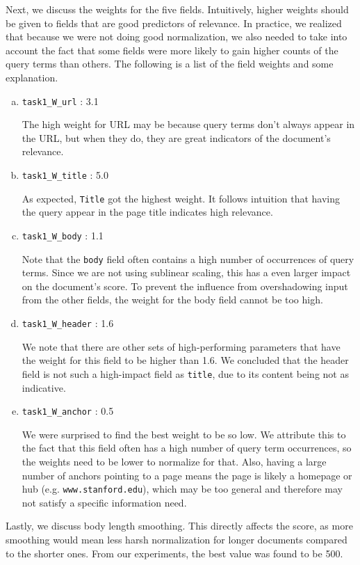 \documentclass[10pt,twocolumn]{article}
\begin{document}
Next, we discuss the weights for the five fields. Intuitively, higher weights should be given to fields that are good predictors of relevance. In practice, we realized that because we were not doing good normalization, we also needed to take into account the fact that some fields were more likely to gain higher counts of the query terms than others. The following is a list of the field weights and some explanation.
\begin{enumerate}[(a)]
\item \texttt{task1\_W\_url} : 3.1

The high weight for URL may be because query terms don't always appear in the URL, but when they do, they are great indicators of the document's relevance.
\item \texttt{task1\_W\_title} : 5.0

As expected, \texttt{Title} got the highest weight. It follows intuition that having the query appear in the page title indicates high relevance. 
\item \texttt{task1\_W\_body} : 1.1

Note that the \texttt{body} field often contains a high number of occurrences of query terms. Since we are not using sublinear scaling, this has a even larger impact on the document's score. To prevent the influence from overshadowing input from the other fields, the weight for the body field cannot be too high.
\item \texttt{task1\_W\_header} : 1.6

We note that there are other sets of high-performing parameters that have the weight for this field to be higher than 1.6. We concluded that the header field is not such a high-impact field as \texttt{title}, due to its content being not as indicative.
\item \texttt{task1\_W\_anchor} : 0.5

We were surprised to find the best weight to be so low. We attribute this to the fact that this field often has a high number of query term occurrences, so the weights need to be lower to normalize for that. Also, having a large number of anchors pointing to a page means the page is likely a homepage or hub (e.g. \texttt{www.stanford.edu}), which may be too general and therefore may not satisfy a specific information need.
\end{enumerate}

Lastly, we discuss body length smoothing. This directly affects the score, as more smoothing would mean less harsh normalization for longer documents compared to the shorter ones. From our experiments, the best value was found to be 500.
\end{document}
